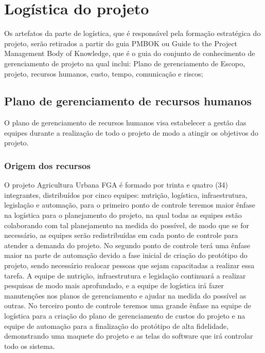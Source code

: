 \chapter{Logística do projeto}

  Os artefatos da parte de logística, que é responsável pela formação estratégica do projeto, serão retirados a partir do guia PMBOK \cite{pmbok}
  ou Guide to the Project Management Body of Knowledge, que é o guia do conjunto de conhecimento de gerenciamento de projeto na qual
  inclui: Plano de gerenciamento de Escopo, projeto, recursos humanos, custo, tempo, comunicação e riscos;

\section{Plano de gerenciamento de recursos humanos}

  O plano de gerenciamento de recursos humanos visa estabelecer a gestão das equipes durante a realização de todo o projeto de modo
  a atingir os objetivos do projeto.

\subsection{Origem dos recursos}

  O projeto Agricultura Urbana FGA é formado por trinta e quatro (34) integrantes, distribuídos por cinco equipes: nutrição, logística,
  infraestrutura, legislação e automação, para o primeiro ponto de controle teremos maior ênfase na logística para o planejamento do
  projeto, na qual todas as equipes estão colaborando com tal planejamento na medida do possível, de modo que se for necessário, as equipes serão redistribuídas em cada ponto de controle para atender a demanda do projeto. No segundo ponto de controle
  terá uma ênfase maior na parte de automação devido a fase inicial de criação do protótipo do projeto, sendo necessário realocar pessoas que sejam capacitadas a realizar essa tarefa. A equipe de nutrição, infraestrutura e legislação continuará a realizar pesquisas de modo mais aprofundado, e a equipe de logística irá fazer manutenções nos planos de gerenciamento e ajudar na medida do possível as outras. No terceiro ponto de controle teremos uma grande ênfase na equipe de logística para a criação do plano de gerenciamento de custos do projeto e na equipe de automação para a finalização do protótipo de alta fidelidade, demonstrando uma maquete do projeto e as telas do software que irá controlar todo os sistema.

